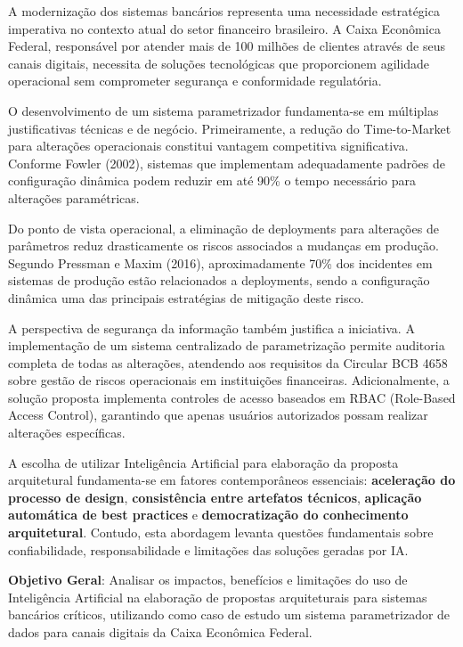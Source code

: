 A modernização dos sistemas bancários representa uma necessidade estratégica imperativa no contexto atual do setor financeiro brasileiro. A Caixa Econômica Federal, responsável por atender mais de 100 milhões de clientes através de seus canais digitais, necessita de soluções tecnológicas que proporcionem agilidade operacional sem comprometer segurança e conformidade regulatória.

O desenvolvimento de um sistema parametrizador fundamenta-se em múltiplas justificativas técnicas e de negócio. Primeiramente, a redução do Time-to-Market para alterações operacionais constitui vantagem competitiva significativa. Conforme Fowler (2002), sistemas que implementam adequadamente padrões de configuração dinâmica podem reduzir em até 90\% o tempo necessário para alterações paramétricas.

Do ponto de vista operacional, a eliminação de deployments para alterações de parâmetros reduz drasticamente os riscos associados a mudanças em produção. Segundo Pressman e Maxim (2016), aproximadamente 70\% dos incidentes em sistemas de produção estão relacionados a deployments, sendo a configuração dinâmica uma das principais estratégias de mitigação deste risco.

A perspectiva de segurança da informação também justifica a iniciativa. A implementação de um sistema centralizado de parametrização permite auditoria completa de todas as alterações, atendendo aos requisitos da Circular BCB 4658 sobre gestão de riscos operacionais em instituições financeiras. Adicionalmente, a solução proposta implementa controles de acesso baseados em RBAC (Role-Based Access Control), garantindo que apenas usuários autorizados possam realizar alterações específicas.

A escolha de utilizar Inteligência Artificial para elaboração da proposta arquitetural fundamenta-se em fatores contemporâneos essenciais: \textbf{aceleração do processo de design}, \textbf{consistência entre artefatos técnicos}, \textbf{aplicação automática de best practices} e \textbf{democratização do conhecimento arquitetural}. Contudo, esta abordagem levanta questões fundamentais sobre confiabilidade, responsabilidade e limitações das soluções geradas por IA.

\textbf{Objetivo Geral}: Analisar os impactos, benefícios e limitações do uso de Inteligência Artificial na elaboração de propostas arquiteturais para sistemas bancários críticos, utilizando como caso de estudo um sistema parametrizador de dados para canais digitais da Caixa Econômica Federal.

